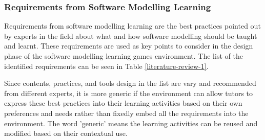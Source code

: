 \documentclass[10pt, a4paper]{report} \usepackage[titletoc]{appendix}
\begin{document}
\subsubsection{Requirements from Software Modelling Learning}
\label{Requirements from Software Modelling Learning}
Requirements from software modelling learning are the best practices pointed out by experts in the field about what and how software modelling should be taught and learnt. These requirements are used as key points to consider in the design phase of the software modelling learning games environment. The list of the identified requirements can be seen in Table \ref{literature-review-1}. 

Since contents, practices, and tools design in the list are vary and recommended from different experts, it is more generic if the environment can allow tutors to express these best practices into their learning activities based on their own preferences and needs rather than fixedly embed all the requirements into the environment. The word 'generic' means the learning activities can be reused and modified based on their contextual use.
\end{document}
